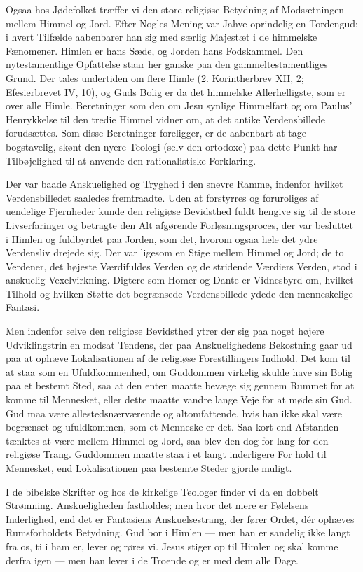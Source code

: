 \documentclass[12pt,a4paper,openany]{book}
\newcommand{\opage}[1]{\marginnote{\footnotesize\textit{[#1]}}}
\begin{document}
Ogsaa hos Jødefolket træffer vi den store religiøse Betydning af
Modsætningen mellem Himmel og Jord. Efter Nogles Mening var Jahve
oprindelig en Tordengud; i hvert Tilfælde aabenbarer han sig med særlig
Majestæt i de himmelske Fænomener. Himlen er hans Sæde, og Jorden hans
Fodskammel. Den nytestamentlige Opfattelse staar her ganske paa den
gammeltestamentliges Grund. Der tales undertiden om flere Himle (2.
Korintherbrev XII, 2; Efesierbrevet IV, 10), og Guds Bolig er da det
himmelske Allerhelligste, som er over alle Himle. Beretninger som den om
Jesu synlige Himmelfart og om Paulus’ Henrykkelse til den tredie Himmel
vidner om, at det antike Verdensbillede forudsættes. Som disse
Beretninger foreligger, er de aabenbart at tage bogstavelig, skønt den
nyere Teologi (selv den ortodoxe) paa dette Punkt har Tilbøjelighed til
at anvende den rationalistiske Forklaring.

Der var baade Anskuelighed og Tryghed i den snevre Ramme, indenfor
hvilket Verdensbilledet saaledes fremtraadte. Uden at forstyrres og
foruroliges af uendelige Fjernheder kunde den religiøse Bevidsthed fuldt
hengive sig til de store Livserfaringer og betragte den Alt afgørende
Forløsningsproces, der var besluttet i Himlen og fuldbyrdet paa Jorden,
som det, hvorom ogsaa hele det ydre Verdensliv drejede sig. Der var
ligesom en Stige mellem Himmel og Jord; de to Verdener, det højeste
Værdifuldes Verden og de stridende Værdiers Verden, stod i anskuelig
Vexelvirkning. Digtere som Homer og Dante er Vidnesbyrd om, hvilket
Tilhold og hvilken Støtte det begrænsede Verdensbillede ydede den
menneskelige Fantasi.

Men indenfor selve den religiøse Bevidsthed ytrer der sig paa noget
højere Udviklingstrin en modsat Tendens, der paa Anskuelighedens
Bekostning gaar ud paa at ophæve Lokalisationen af de religiøse
Forestillingers Indhold. Det kom til at staa som en Ufuldkommenhed, om
Guddommen virkelig skulde have sin Bolig paa et bestemt Sted, saa at den
enten maatte bevæge sig gennem Rummet for at komme til Mennesket, eller
dette maatte vandre lange Veje for at møde sin Gud. Gud maa være
allestedsnærværende og altomfattende, hvis han ikke skal være begrænset
og ufuldkommen, som et Menneske er det. Saa kort end Afstanden tænktes
at være mellem Himmel og Jord, saa blev den dog for lang for den
religiøse Trang. Guddommen maatte staa i et langt inderligere For%
\opage{26}hold til Mennesket, end Lokalisationen paa bestemte Steder
gjorde muligt.

I de bibelske Skrifter og hos de kirkelige Teologer finder vi da en
dobbelt Strømning. Anskueligheden fastholdes; men hvor det mere er
Følelsens Inderlighed, end det er Fantasiens Anskuelsestrang, der fører
Ordet, dér ophæves Rumsforholdets Betydning. Gud bor i Himlen --- men
han er sandelig ikke langt fra os, ti i ham er, lever og røres vi. Jesus
stiger op til Himlen og skal komme derfra igen --- men han lever i de
Troende og er med dem alle Dage.
\end{document}

